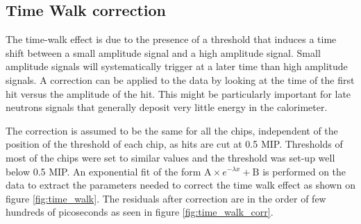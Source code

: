 \subsection{Time Walk correction}
\label{subsec:timewalk}

The time-walk effect is due to the presence of a threshold that induces a time shift between a small amplitude signal and a high amplitude signal. Small amplitude signals will systematically trigger at a later time than high amplitude signals. A correction can be applied to the data by looking at the time of the first hit versus the amplitude of the hit. This might be particularly important for late neutrons signals that generally deposit very little energy in the calorimeter.

The correction is assumed to be the same for all the chips, independent of the position of the threshold of each chip, as hits are cut at 0.5 MIP. Thresholds of most of the chips were set to similar values and the threshold was set-up well below 0.5 MIP. An exponential fit of the form $\text{A} \times e^{-\lambda{}x} + \text{B}$ is performed on the data to extract the parameters needed to correct the time walk effect as shown on figure \ref{fig:time_walk}. The residuals after correction are in the order of few hundreds of picoseconds as seen in figure \ref{fig:time_walk_corr}.


